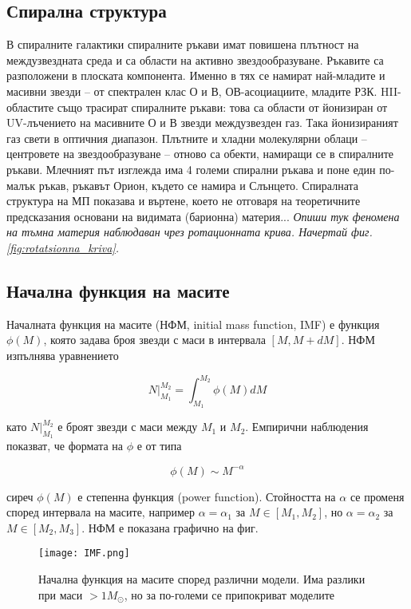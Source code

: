 \documentclass[a4paper,12pt]{article}
\begin{document}
\subsection{Спирална структура}
В спиралните галактики спиралните ръкави имат повишена плътност на междузвездната среда и са области на активно звездообразуване. Ръкавите са разположени в плоската компонента. Именно в тях се намират най-младите и масивни звезди – от спектрален клас О и В, ОВ-асоциациите, младите РЗК. HII-областите също трасират спиралните ръкави: това са области от йонизиран от UV-лъчението на масивните О и В звезди междузвезден газ. Така йонизираният газ свети в оптичния диапазон. Плътните и хладни молекулярни облаци – центровете на звездообразуване – отново са обекти, намиращи се в спиралните ръкави.
Млечният път изглежда има 4 големи спирални ръкава и поне един по-малък ръкав, ръкавът Орион, където се намира и Слънцето. Спиралната структура на МП показава и въртене, което не отговаря на теоретичните предсказания основани на видимата (барионна) материя... \textit{Опиши тук феномена на тъмна материя наблюдаван чрез ротационната крива. Начертай фиг. \ref{fig:rotatsionna_kriva}.}

\subsection{Начална функция на масите}
Началната функция на масите (НФМ, initial mass function, IMF) е функция $\phi(M)$, която задава броя звезди с маси в интервала $[M, M+dM]$. НФМ изпълнява уравнението

\begin{equation}
    N|_{M_1}^{M_2} = \int_{M_1}^{M_2} \phi(M) dM
\end{equation}

като $N|_{M_1}^{M_2}$ е броят звезди с маси между $M_1$ и $M_2$. Емпирични наблюдения показват, че формата на $\phi$ е от типа

\begin{equation}
    \phi(M) \sim M^{-\alpha}
\end{equation}

сиреч $\phi(M)$ е степенна функция (power function). Стойността на $\alpha$ се променя според интервала на масите, например $\alpha = \alpha_1$ за $M \in [M_1, M_2]$, но $\alpha = \alpha_2$ за $M \in [M_2, M_3]$. НФМ е показана графично на фиг. 

\begin{figure}[h!]
\centering
\texttt{[image: IMF.png]}
\caption{Начална функция на масите според различни модели. Има разлики при маси $>1 M_\odot$, но за по-големи се припокриват моделите}
\label{fig:IMF}
\end{figure}
\end{document}
